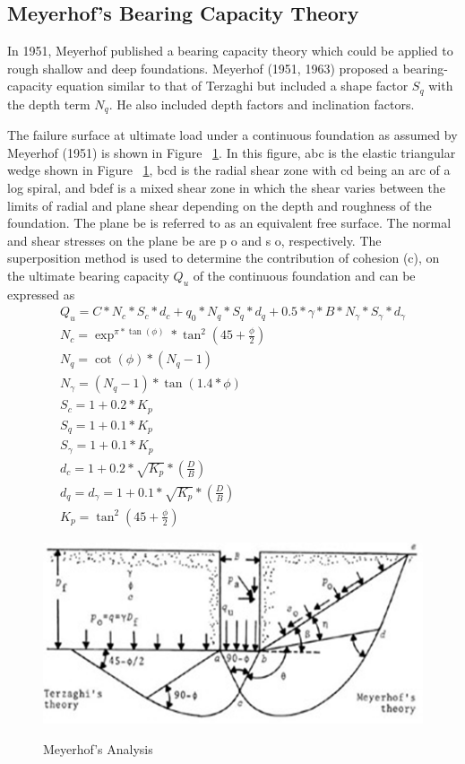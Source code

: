 \subsection{Meyerhof’s Bearing Capacity Theory}
In 1951, Meyerhof published a bearing capacity theory which could be applied to rough shallow and deep foundations. Meyerhof (1951, 1963) proposed a bearing-capacity equation similar to that of Terzaghi but included a shape factor $S_q$ with the depth term $N_q$. He also included depth factors and inclination factors.
\par
The failure surface at ultimate load under a continuous foundation as assumed by Meyerhof (1951) is shown in Figure ~\ref{meyerhof-analysis}. In this figure, abc is the elastic triangular wedge shown in Figure ~\ref{meyerhof-analysis}, bcd is the radial shear zone with cd being an arc of a log spiral, and bdef is a mixed shear zone in which the shear varies between the limits of radial and plane shear depending on the depth and roughness of the foundation. The plane be is referred to as an equivalent free surface. The normal and shear stresses on the plane be are p o and s o, respectively. The superposition method is used to determine the contribution of cohesion (c), on the ultimate bearing capacity $Q_u$ of the continuous foundation and can be expressed as
\begin{gather}
Q_u = C * N_c * S_c * d_c + q_0 * N_q * S_q * d_q + 0.5 * {\gamma} * B * N_{\gamma}*S_{\gamma}*d_{\gamma}\\
N_c = \exp^{\pi * \tan(\phi)} * \tan^2 ( 45 + \frac{\phi}{2} )\\
N_q = \cot(\phi)*(N_q - 1)\\
N_{\gamma} = (N_q-1) * \tan(1.4*\phi)\\
S_c = 1 + 0.2 * K_p\\
S_q=1+0.1*K_p\\
S_{\gamma}=1+0.1*K_p\\
d_c=1+0.2*\sqrt{K_p}*(\frac{D}{B})\\
d_q=d_{\gamma}=1+0.1*\sqrt{K_p}*(\frac{D}{B})\\
K_p= \tan ^ 2 (45 + \frac{\phi}{2})
\end{gather}
\begin{figure}
\centering
\caption{Meyerhof’s Analysis}
\includegraphics{images/main/meyerhof-analysis.png}
\label{meyerhof-analysis}
\end{figure}

